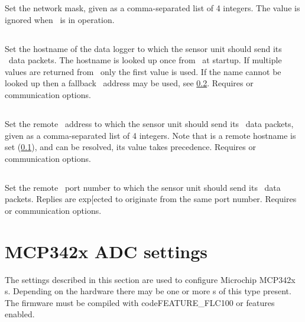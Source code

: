 Set the network mask, given as a comma-separated list of 4
integers. The value is ignored when \dhcp\ is in operation.


\subsection[remote-hostname]{}
\label{sec:eeprom-remote-hostname}

Set the hostname of the data logger to which the sensor unit should send its
\udp\ data packets. The hostname is looked up once from \dns\ at startup. If
multiple values are returned from \dns\ only the first value is used. If the
name cannot be looked up then a fallback \ip\ address may be used, see
\ref{sec:eeprom-remote-ip-address}. Requires  or 
communication options.


\subsection[remote-ip-address]{}
\label{sec:eeprom-remote-ip-address}

Set the remote \ip\ address to which the sensor unit should send its
\udp\ data packets, given as a comma-separated list of 4 integers. Note that is
a remote hostname is set (\ref{sec:eeprom-remote-hostname}), and can be
resolved, its value takes
precedence. Requires  or 
communication options.


\subsection[remote-ip-port]{}

Set the remote \ip\ port number to which the sensor unit should send its \udp\
data packets. Replies are exp[ected to originate from the same port number.
Requires \code {W5100} or \code{W5500} communication options.


\section{MCP342x ADC settings}
\label{sec:eeprom-mcp342x-adc}

The settings described in this section are used to configure Microchip
MCP342x \adc s. Depending on the hardware there may be one or more
\adc s of this type present. The firmware must be compiled with
code{FEATURE_FLC100} or  features enabled.

